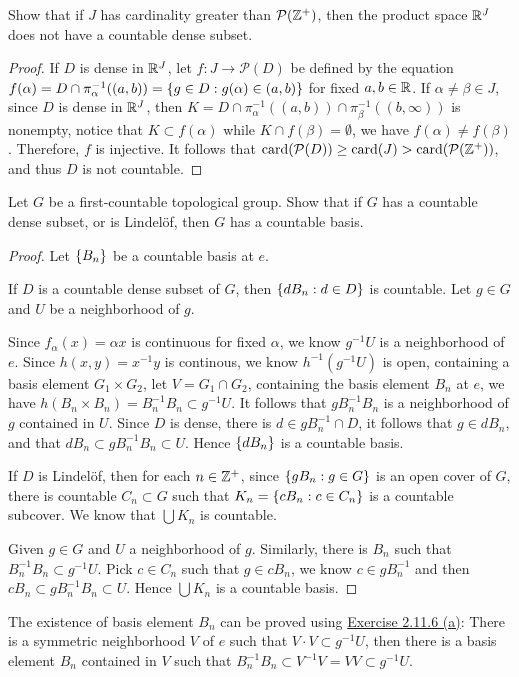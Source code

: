 \documentclass[12pt,a4paper]{article}
\begin{document}
    \begin{ex}
        Show that if $J$ has cardinality greater than $\mathcal{P}(\mathbb{Z}^+)$, then the product space $\mathbb{R}^J$ does not have a countable dense subset.
    \end{ex}
    \begin{proof}
        If $D$ is dense in $\mathbb{R}^J$, let $f:J\to \mathcal{P}(D)$ be defined by the equation $f(\alpha)=D\cap\pi_{\alpha}^{-1}((a,b))=\left\{g\in D:g(\alpha)\in(a,b)\right\}$ for fixed $a,b\in\mathbb{R}$. If $\alpha\neq\beta\in J$, since $D$ is dense in $\mathbb{R}^J$, then $K=D\cap\pi_{\alpha}^{-1}((a,b))\cap\pi_{\beta}^{-1}((b,\infty))$ is nonempty, notice that $K\subset f(\alpha)$ while $K\cap f(\beta)=\emptyset$, we have $f(\alpha)\neq f(\beta)$. Therefore, $f$ is injective. It follows that $\operatorname{card}(\mathcal{P}(D))\geq\operatorname{card}(J)>\operatorname{card}(\mathcal{P}(\mathbb{Z}^+))$, and thus $D$ is not countable.
    \end{proof}
    \hfill

    \begin{ex}
        Let $G$ be a first-countable topological group. Show that if $G$ has a countable dense subset, or is Lindel\"of, then $G$ has a countable basis.
    \end{ex}
    \begin{proof}
        Let $\left\{B_n\right\}$ be a countable basis at $e$.

        If $D$ is a countable dense subset of $G$, then $\left\{dB_n:d\in D\right\}$ is countable. Let $g\in G$ and $U$ be a neighborhood of $g$.
        
        Since $f_\alpha(x)=\alpha x$ is continuous for fixed $\alpha$, we know $g^{-1}U$ is a neighborhood of $e$. Since $h(x,y)=x^{-1}y$ is continous, we know $h^{-1}(g^{-1}U)$ is open, containing a basis element $G_1\times G_2$, let $V=G_1\cap G_2$, containing the basis element $B_n$ at $e$, we have $h(B_n\times B_n)=B_n^{-1}B_n\subset g^{-1}U$. It follows that $gB_n^{-1}B_n$ is a neighborhood of $g$ contained in $U$. Since $D$ is dense, there is $d\in gB_n^{-1}\cap D$, it follows that $g\in dB_n$, and that $dB_n\subset gB_n^{-1}B_n\subset U$. Hence $\left\{dB_n\right\}$ is a countable basis.

        If $D$ is Lindel\"of, then for each $n\in\mathbb{Z}^+$, since $\left\{gB_n:g\in G\right\}$ is an open cover of $G$, there is countable $C_n\subset G$ such that $K_n=\left\{cB_n:c\in C_n\right\}$ is a countable subcover. We know that $\bigcup K_n$ is countable.

        Given $g\in G$ and $U$ a neighborhood of $g$. Similarly, there is $B_n$ such that $B_n^{-1}B_n\subset g^{-1}U$. Pick $c\in C_n$ such that $g\in cB_n$, we know $c\in gB_n^{-1}$ and then $cB_n\subset gB_n^{-1}B_n\subset U$. Hence $\bigcup K_n$ is a countable basis.
    \end{proof}
    \begin{remark}
        The existence of basis element $B_n$ can be proved using \hyperref[2.11.6]{Exercise 2.11.6 (a)}: There is a symmetric neighborhood $V$ of $e$ such that $V\cdot V\subset g^{-1}U$, then there is a basis element $B_n$ contained in $V$ such that $B_n^{-1}B_n\subset V^{-1}V=VV\subset g^{-1}U$. 
    \end{remark}
    \hfill
\end{document}

